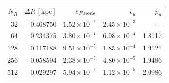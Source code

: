 \begin{tabular}{rrrrr}\toprule
$N_R$ & $\Delta R\ [\mathrm{kpc}]$ & $e_{F,\rm node}$ & $e_u$ & $p_u$ \\
\midrule
32 & 0.468750 & $1.52\times 10^{-3}$ & $2.45\times 10^{-3}$ & --- \\
64 & 0.234375 & $3.80\times 10^{-4}$ & $6.98\times 10^{-4}$ & 1.8117 \\
128 & 0.117188 & $9.51\times 10^{-5}$ & $1.85\times 10^{-4}$ & 1.9121 \\
256 & 0.058594 & $2.38\times 10^{-5}$ & $4.80\times 10^{-5}$ & 1.9486 \\
512 & 0.029297 & $5.94\times 10^{-6}$ & $1.12\times 10^{-5}$ & 2.0986 \\
\bottomrule\end{tabular}
